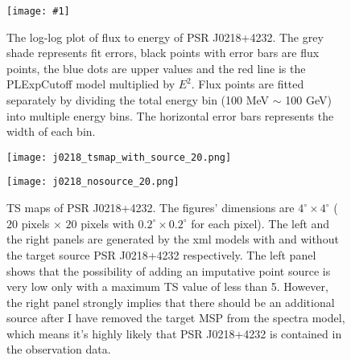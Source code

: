 \documentclass[12pt]{report}
\newcommand{\singleFig}[3]{
  \begin{figure}[!htp]
    \centering
    \texttt{[image: \#1]}
    \caption{#3}
    \label{fig: #1}
  \end{figure}
}
\newcommand{\change}[1]{
  $<$\colorbox{red}{\textbf{change}}$>$#1$<$\colorbox{red}{\textbf{/change}}$>$
}
\begin{document}
      \singleFig{j0218_cur.png}{0.35}{The log-log plot of flux to energy of PSR J0218+4232. The grey shade represents 
        fit errors, black points with error bars are flux points, the blue dots are upper values and the 
        red line is the PLExpCutoff model multiplied by $E^2$. Flux points 
        are fitted separately by dividing the total energy bin (100 MeV $\sim$ 100 GeV) into multiple energy bins.
        The horizontal error bars represents the width of each bin. }
      \vspace{1cm}
      \begin{figure}[!htp]
        \begin{center}
        \begin{minipage}{0.46\textwidth}
          \begin{center} 
            \texttt{[image: j0218\_tsmap\_with\_source\_20.png]}
          \end{center}
        \end{minipage}
        \begin{minipage}{0.45\textwidth}
          \begin{center}
            \texttt{[image: j0218\_nosource\_20.png]}
          \end{center}
        \end{minipage}
      \end{center}
      \caption{TS maps of PSR J0218+4232. The figures' dimensions are 
        $4^{\circ} \times 4^{\circ}$ ($20$ pixels $\times$ $20$ pixels with 
        $0.2^{\circ} \times 0.2^{\circ}$ for each pixel). The left and the right panels are 
        generated by the xml models with and without the target source PSR J0218+4232 respectively.
        The left panel shows that the possibility of adding an imputative point source is very low 
        only with a maximum TS value of less than 5. However, the right panel strongly implies that 
        there should be an additional source after I have removed the target MSP from the spectra 
        model, which means it's highly likely that PSR J0218+4232 is contained in the observation 
        data.}
      \label{fig: j0218_tsmap_comparison_20}
      \end{figure}
\end{document}

